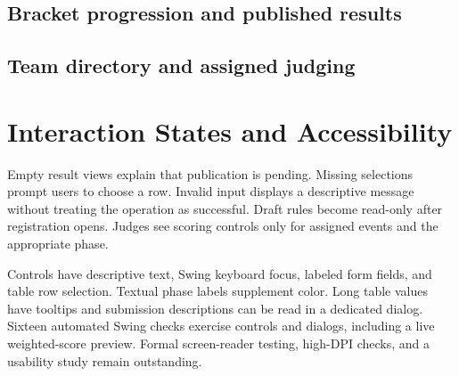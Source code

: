 \subsection*{Bracket progression and published results}
\clearpage
\subsection*{Team directory and assigned judging}
\section{Interaction States and Accessibility}
Empty result views explain that publication is pending. Missing selections prompt users to choose a row. Invalid input displays a descriptive message without treating the operation as successful. Draft rules become read-only after registration opens. Judges see scoring controls only for assigned events and the appropriate phase.

Controls have descriptive text, Swing keyboard focus, labeled form fields, and table row selection. Textual phase labels supplement color. Long table values have tooltips and submission descriptions can be read in a dedicated dialog. Sixteen automated Swing checks exercise controls and dialogs, including a live weighted-score preview. Formal screen-reader testing, high-DPI checks, and a usability study remain outstanding.
